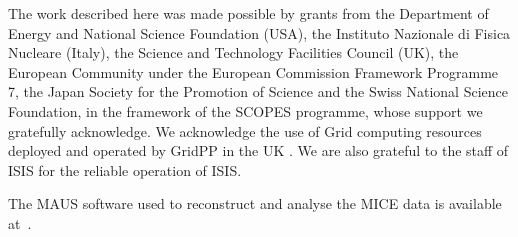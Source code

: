 \acknowledgments

The work described here was made possible by grants from the Department of Energy and National Science Foundation (USA), the Instituto Nazionale di Fisica Nucleare (Italy), 
the Science and Technology Facilities Council (UK), the European Community under the European Commission Framework Programme 7, the Japan Society for the Promotion of 
Science and the Swiss National Science Foundation, in the framework of the SCOPES programme, whose support we gratefully acknowledge. We acknowledge the use of Grid 
computing resources deployed and operated by GridPP in the UK \cite{grid_pp_2009}. We are also grateful to the staff of ISIS for the reliable operation of ISIS.

The MAUS software used to reconstruct and analyse the MICE data is available at~\cite{MICE_code}.
